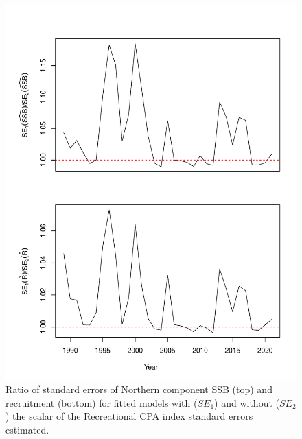 \documentclass[
]{article}
\begin{document}
\begin{figure}

{\centering \includegraphics{bsb_models_wp_files/figure-latex/relative-se-ssb-R-1} 

}

\caption{Ratio of standard errors of Northern component SSB (top) and recruitment (bottom) for fitted models with ($SE_1$) and without ($SE_2$) the scalar of the Recreational CPA index standard errors estimated.}\label{fig:relative-se-ssb-R}
\end{figure}

\clearpage
\end{document}
